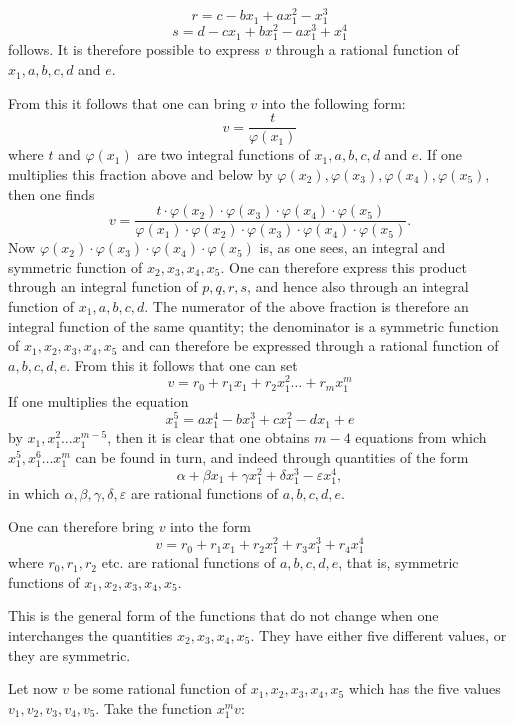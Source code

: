 \documentclass{article}
\begin{document}
\[ r = c - bx_1 + ax_1^{2} - x_1^{3} \]
\[ s = d - cx_1 + bx_1^{2} - ax_1^{3} + x_1^{4} \]
follows. It is therefore possible to express $v$ through a rational function of $x_1, a, b, c, d$ and $e$.

From this it follows that one can bring $v$ into the following form:
\[ v = \frac{t}{\varphi(x_1)} \]
where $t$ and $\varphi(x_1)$ are two integral functions of $x_1, a, b, c, d$ and $e$. If one multiplies this fraction above and below by $\varphi(x_2), \varphi(x_3), \varphi(x_4), \varphi(x_5)$, then one finds
\[ v = \frac{t \cdot \varphi(x_2) \cdot \varphi(x_3) \cdot \varphi(x_4) \cdot \varphi(x_5)}{\varphi(x_1) \cdot \varphi(x_2) \cdot \varphi(x_3) \cdot \varphi(x_4) \cdot \varphi(x_5)}. \]
Now $\varphi(x_2) \cdot \varphi(x_3) \cdot \varphi(x_4) \cdot \varphi(x_5)$ is, as one sees, an integral and symmetric function of $x_2, x_3, x_4, x_5$. One can therefore express this product through an integral function of $p, q, r, s$, and hence also through an integral function of $x_1, a, b, c, d$. The numerator of the above fraction is therefore an integral function of the same quantity; the denominator is a symmetric function of $x_1, x_2, x_3, x_4, x_5$ and can therefore be expressed through a rational function of $a, b, c, d, e$. From this it follows that one can set
\[ v = r_0 + r_1 x_1 + r_2 x_1^{2} \ldots + r_m x_1^{m} \]
If one multiplies the equation
\[ x_1^{5} = ax_1^{4} - bx_1^{3} + cx_1^{2} - dx_1 + e \]
by $x_1, x_1^{2} \ldots x_1^{m-5}$, then it is clear that one obtains $m - 4$ equations from which $x_1^{5}, x_1^{6} \ldots x_1^{m}$ can be found in turn, and indeed through quantities of the form
\[ \alpha + \beta x_1 + \gamma x_1^{2} + \delta x_1^{3} - \varepsilon x_1^{4}, \]
in which $\alpha, \beta, \gamma, \delta, \varepsilon$ are rational functions of $a, b, c, d, e$.

One can therefore bring $v$ into the form
\[ v = r_0 + r_1 x_1 + r_2 x_1^{2} + r_3 x_1^{3} + r_4 x_1^{4} \tag{a} \]
where $r_0, r_1, r_2$ etc. are rational functions of $a, b, c, d, e$, that is, symmetric functions of $x_1, x_2, x_3, x_4, x_5$.

This is the general form of the functions that do not change when one interchanges the quantities $x_2, x_3, x_4, x_5$. They have either five different values, or they are symmetric.

Let now $v$ be some rational function of $x_1, x_2, x_3, x_4, x_5$ which has the five values $v_1, v_2, v_3, v_4, v_5$. Take the function $x_1^{m} v$:
\end{document}
